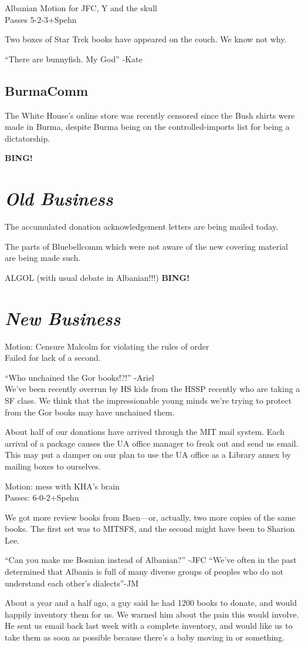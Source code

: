 \documentclass[10pt]{article}
\newcommand{\bing}{{\bf BING!} }
\newcommand{\goto}[1]{\bing \vskip 12pt \section*{{\em{#1}}}}
\begin{document}
Albanian Motion for JFC, Y and the skull\\
Passes 5-2-3+Spehn

Two boxes of Star Trek books have appeared on the couch.  We know not
why.

``There are bunnyfish.  My God'' -Kate

\subsection*{BurmaComm}
The White House's online store was recently censored since the Bush
shirts were made in Burma, despite Burma being on the
controlled-imports list for being a dictatorship.

\goto{Old Business}
The accumulated donation acknowledgement letters are being mailed
today.

The parts of Bluebellcomm which were not aware of the new covering
material are being made such.

ALGOL (with usual debate in Albanian!!!)
\goto{New Business}
Motion: Censure Malcolm for violating the rules of order\\
Failed for lack of a second.

``Who unchained the Gor books!?!'' -Ariel\\
We've been recently overrun by HS kids from the HSSP recently who are
taking a SF class. We think that the impressionable young minds we're
trying to protect from the Gor books may have unchained them.

About half of our donations have arrived through the MIT mail system.
Each arrival of a package causes the UA office manager to freak out
and send us email. This may put a damper on our plan to use the UA
office as a Library annex by mailing boxes to ourselves.

Motion: mess with KHA's brain\\
Passes: 6-0-2+Spehn

We got more review books from Baen---or, actually, two more copies of
the same books. The first set was to MITSFS, and the second might have
been to Sharion Lee.

``Can you make me Bosnian instead of Albanian?'' -JFC
``We've often in the past determined that Albania is full of many
diverse groups of peoples who do not understand each other's dialects''-JM

About a year and a half ago, a guy said he had 1200 books to donate,
and would happily inventory them for us. We warned him about the pain
this would involve. He sent us email back last week with a complete
inventory, and would like us to take them as soon as possible because
there's a baby moving in or something.
\end{document}

